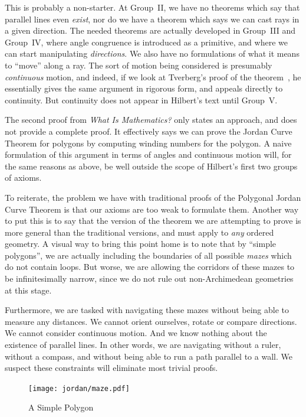 This is probably a non-starter. At Group~II, we have no theorems which say that parallel lines even \emph{exist}, nor do we have a theorem which says we can cast rays in a given direction. The needed theorems are actually developed in Group~III and Group~IV, where angle congruence is introduced as a primitive, and where we can start manipulating \emph{directions}. We also have no formulations of what it means to ``move'' along a ray. The sort of motion being considered is presumably \emph{continuous} motion, and indeed, if we look at Tverberg's proof of the theorem~\cite{TverbergJordan}, he essentially gives the same argument in rigorous form, and appeals directly to continuity. But  continuity does not appear in Hilbert's text until Group~V. 

The second proof from \emph{What Is Mathematics?} only states an approach, and does not provide a complete proof. It effectively says we can prove the Jordan Curve Theorem for polygons by computing winding numbers for the polygon. A naive formulation of this argument in terms of angles and continuous motion will, for the same reasons as above, be well outside the scope of Hilbert's first two groups of axioms. 

To reiterate, the problem we have with traditional proofs of the Polygonal Jordan Curve Theorem is that our axioms are too weak to formulate them. Another way to put this is to say that the version of the theorem we are attempting to prove is more general than the traditional versions, and must apply to \emph{any} ordered geometry. A visual way to bring this point home is to note that by ``simple polygons'', we are actually including the boundaries of all possible \emph{mazes} which do not contain loops. But worse, we are allowing the corridors of these mazes to be infinitesimally narrow, since we do not rule out non-Archimedean geometries at this stage.

Furthermore, we are tasked with navigating these mazes without being able to measure any distances. We cannot orient ourselves, rotate or compare directions. We cannot consider continuous motion. And we know nothing about the existence of parallel lines. In other words, we are navigating without a ruler, without a compass, and without being able to run a path parallel to a wall. We suspect these constraints will eliminate most trivial proofs.

\begin{figure}
\centering
\texttt{[image: jordan/maze.pdf]}
\caption{A Simple Polygon}
\end{figure}

